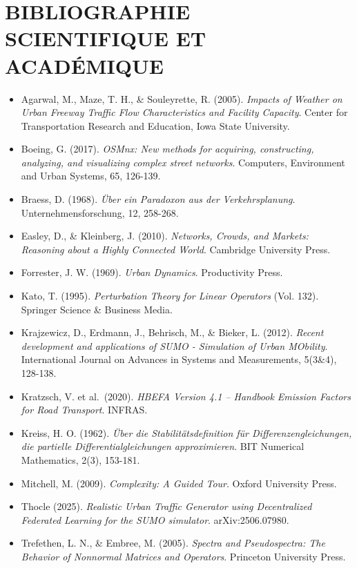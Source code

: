 \documentclass[10pt, a4paper]{article}
\providecommand{\tightlist}{}
\begin{document}
\newpage

\section{BIBLIOGRAPHIE SCIENTIFIQUE ET
ACADÉMIQUE}\label{bibliographie-scientifique-et-acaduxe9mique}

\begin{itemize}
\tightlist
\item
  Agarwal, M., Maze, T. H., \& Souleyrette, R. (2005). \emph{Impacts of
  Weather on Urban Freeway Traffic Flow Characteristics and Facility
  Capacity}. Center for Transportation Research and Education, Iowa
  State University.
\item
  Boeing, G. (2017). \emph{OSMnx: New methods for acquiring,
  constructing, analyzing, and visualizing complex street networks}.
  Computers, Environment and Urban Systems, 65, 126-139.
\item
  Braess, D. (1968). \emph{Über ein Paradoxon aus der Verkehrsplanung}.
  Unternehmensforschung, 12, 258-268.
\item
  Easley, D., \& Kleinberg, J. (2010). \emph{Networks, Crowds, and
  Markets: Reasoning about a Highly Connected World}. Cambridge
  University Press.
\item
  Forrester, J. W. (1969). \emph{Urban Dynamics}. Productivity Press.
\item
  Kato, T. (1995). \emph{Perturbation Theory for Linear Operators} (Vol.
  132). Springer Science \& Business Media.
\item
  Krajzewicz, D., Erdmann, J., Behrisch, M., \& Bieker, L. (2012).
  \emph{Recent development and applications of SUMO - Simulation of
  Urban MObility}. International Journal on Advances in Systems and
  Measurements, 5(3\&4), 128-138.
\item
  Kratzsch, V. et al.~(2020). \emph{HBEFA Version 4.1 -- Handbook
  Emission Factors for Road Transport}. INFRAS.
\item
  Kreiss, H. O. (1962). \emph{Über die Stabilitätsdefinition für
  Differenzengleichungen, die partielle Differentialgleichungen
  approximieren}. BIT Numerical Mathematics, 2(3), 153-181.
\item
  Mitchell, M. (2009). \emph{Complexity: A Guided Tour}. Oxford
  University Press.
\item
  Thocle (2025). \emph{Realistic Urban Traffic Generator using
  Decentralized Federated Learning for the SUMO simulator}.
  arXiv:2506.07980.
\item
  Trefethen, L. N., \& Embree, M. (2005). \emph{Spectra and
  Pseudospectra: The Behavior of Nonnormal Matrices and Operators}.
  Princeton University Press.
\end{itemize}
\end{document}
